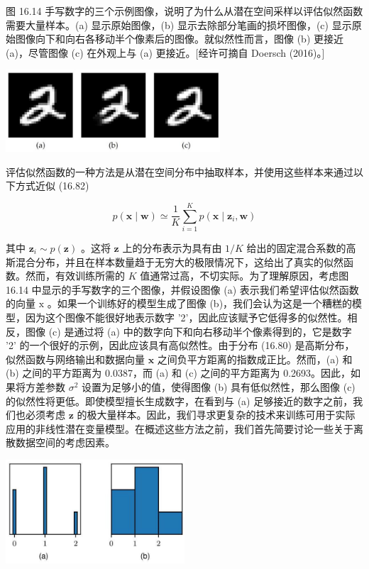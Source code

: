 \documentclass[10pt]{article}
\begin{document}
图 16.14 手写数字的三个示例图像，说明了为什么从潜在空间采样以评估似然函数需要大量样本。(a) 显示原始图像，(b) 显示去除部分笔画的损坏图像，(c) 显示原始图像向下和向右各移动半个像素后的图像。就似然性而言，图像 (b) 更接近 (a)，尽管图像 (c) 在外观上与 (a) 更接近。[经许可摘自 Doersch (2016)。]

\begin{center}
\includegraphics[max width=0.6\textwidth]{images/0194e279-9b28-703a-88f4-c3ac21e2010d_544_741_346_810_310_0.jpg}
\end{center}
\hspace*{3em} 

评估似然函数的一种方法是从潜在空间分布中抽取样本，并使用这些样本来通过以下方式近似 (16.82)

\[
p\left( {\mathbf{x} \mid  \mathbf{w}}\right)  \simeq  \frac{1}{K}\mathop{\sum }\limits_{{i = 1}}^{K}p\left( {\mathbf{x} \mid  {\mathbf{z}}_{i},\mathbf{w}}\right)  \tag{16.83}
\]

其中 \({\mathbf{z}}_{i} \sim  p\left( \mathbf{z}\right)\) 。这将 \(\mathbf{z}\) 上的分布表示为具有由 \(1/K\) 给出的固定混合系数的高斯混合分布，并且在样本数量趋于无穷大的极限情况下，这给出了真实的似然函数。然而，有效训练所需的 \(K\) 值通常过高，不切实际。为了理解原因，考虑图 16.14 中显示的手写数字的三个图像，并假设图像 (a) 表示我们希望评估似然函数的向量 \(\mathrm{x}\) 。如果一个训练好的模型生成了图像 (b)，我们会认为这是一个糟糕的模型，因为这个图像不能很好地表示数字 '2'，因此应该赋予它低得多的似然性。相反，图像 (c) 是通过将 (a) 中的数字向下和向右移动半个像素得到的，它是数字 '2' 的一个很好的示例，因此应该具有高似然性。由于分布 (16.80) 是高斯分布，似然函数与网络输出和数据向量 \(\mathbf{x}\) 之间负平方距离的指数成正比。然而，(a) 和 (b) 之间的平方距离为 0.0387，而 (a) 和 (c) 之间的平方距离为 0.2693。因此，如果将方差参数 \({\sigma }^{2}\) 设置为足够小的值，使得图像 (b) 具有低似然性，那么图像 (c) 的似然性将更低。即使模型擅长生成数字，在看到与 (a) 足够接近的数字之前，我们也必须考虑 \(\mathbf{z}\) 的极大量样本。因此，我们寻求更复杂的技术来训练可用于实际应用的非线性潜在变量模型。在概述这些方法之前，我们首先简要讨论一些关于离散数据空间的考虑因素。

\begin{center}
\includegraphics[max width=0.5\textwidth]{images/0194e279-9b28-703a-88f4-c3ac21e2010d_545_873_345_630_364_0.jpg}
\end{center}
\hspace*{3em} 
\end{document}
